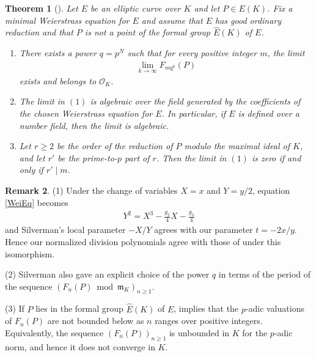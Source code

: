 \documentclass[11pt]{amsart}
\newtheorem{thm}{Theorem}[section]
\theoremstyle{definition}
\newtheorem{rmk}[thm]{Remark}
\begin{document}
\begin{thm}[{\cite[Theorem 12]{Si05a}}]\label{Silverman thm}
Let $E$ be an elliptic curve over $K$ and let $P \in E(K)$. 
Fix a minimal Weierstrass equation for $E$ and assume that $E$ has good ordinary reduction and that $P$ is not a point of the formal group $\hat{E}(K)$ of $E$.
\begin{enumerate}
\item There exists a power $q=p^N$ such that for every positive integer $m$, the limit
%
\begin{align*}
\lim_{k\to \infty} F_{mq^k} (P)
\end{align*}
%
exists and belongs to $\mathcal{O}_K$.
\item The limit in $(1)$ is algebraic over the field generated by the coefficients of the chosen Weierstrass
equation for $E$. In particular, if $E$ is defined over a number field, then the limit is algebraic.
\item Let $r \geq 2$ be the order of the reduction of $P$ modulo the maximal ideal of $K$, and let $r'$ be the prime-to-$p$ part of $r$. Then the limit in $(1)$ is zero if and only if ${r'} \mid m$.
\end{enumerate}
\end{thm}

\begin{rmk}
(1) Under the change of variables $X=x$ and $Y=y/2$, equation \eqref{WeiEq} becomes 
%
\begin{align*}
Y^2=X^3-\frac{g_2}{4}X-\frac{g_3}{4}
\end{align*}
%
and Silverman's local parameter $-X/Y$ agrees with our parameter $t=-2x/y$. Hence our normalized division polynomials agree with those of \cite{Si05a} under this isomorphism.

(2) Silverman also gave an explicit choice of the power $q$ in terms of the period of the sequence $(F_n(P) \bmod \mathfrak{m}_K)_{n \geq 1}$.

(3) If $P$ lies in the formal group $\hat{E}(K)$ of $E$, \cite[Theorem 6.1]{St16} implies that the $p$-adic valuations of $F_n(P)$ are not bounded below as $n$ ranges over positive integers. 
Equivalently, the sequence $(F_n(P))_{n \geq 1}$ is unbounded in $K$ for the $p$-adic norm, and hence it does not converge in $K$.
\end{rmk}
\end{document}
